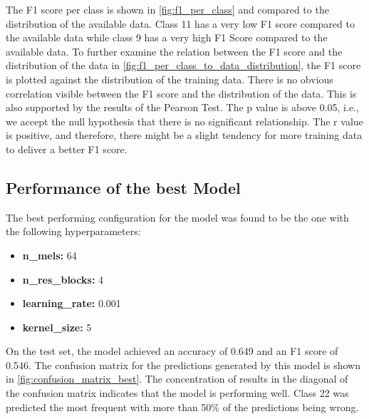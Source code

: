 

The F1 score per class is shown in \autoref{fig:f1_per_class} and compared to the distribution
of the available data. Class 11 has a very low F1 score compared to the available data while class 9 has a very high F1 Score
compared to the available data. To further examine the relation between the F1 score and the distribution of the data
in \autoref{fig:f1_per_class_to_data_distribution}, the F1 score is plotted against the distribution of the training data.
There is no obvious correlation visible between the F1 score and the distribution of the data. This is also supported by the results
of the Pearson Test. The p value is above 0.05, i.e., we accept the null hypothesis that there is no significant relationship. The r value
is positive, and therefore, there might be a slight tendency for more training data to deliver a better F1 score.






\subsection{Performance of the best Model}%

The best performing configuration for the model was found to be the one with the following hyperparameters:

\begin{itemize}
    \item \textbf{n\_mels:} 64
    \item \textbf{n\_res\_blocks:} 4
    \item \textbf{learning\_rate:} 0.001
    \item \textbf{kernel\_size:} 5
\end{itemize}

On the test set, the model achieved an accuracy of 0.649 and an F1 score of 0.546. 
The confusion matrix for the predictions generated by this model is shown in \autoref{fig:confusion_matrix_best}.
The concentration of results in the diagonal of the confusion matrix indicates that the model is performing well.
Class 22 was predicted the most frequent with more than 50\% of the predictions being wrong.

